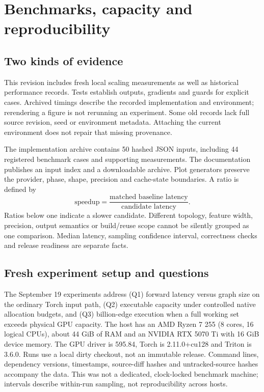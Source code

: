 \section{Benchmarks, capacity and reproducibility}
\label{sec:evaluation}
\subsection{Two kinds of evidence}
This revision includes fresh local scaling measurements as well as historical
performance records. Tests establish outputs, gradients and guards for explicit
cases. Archived timings describe the recorded implementation and environment;
rerendering a figure is not rerunning an experiment. Some old records lack full
source revision, seed or environment metadata. Attaching the current environment
does not repair that missing provenance.

The implementation archive contains 50 hashed JSON inputs, including 44 registered
benchmark cases and supporting measurements. The documentation publishes an input
index and a downloadable archive. Plot generators preserve the provider, phase,
shape, precision and cache-state boundaries. A ratio is defined by
$$
 \text{speedup}=\frac{\text{matched baseline latency}}{\text{candidate latency}}.
$$
Ratios below one indicate a slower candidate. Different topology, feature width,
precision, output semantics or build/reuse scope cannot be silently grouped as
one comparison. Median latency, sampling confidence interval, correctness checks
and release readiness are separate facts.

\subsection{Fresh experiment setup and questions}
The September 19 experiments address (Q1) forward latency versus graph size on
the ordinary Torch input path, (Q2) executable capacity under controlled native
allocation budgets, and (Q3) billion-edge execution when a full working set
exceeds physical GPU capacity. The host has an AMD Ryzen 7 255 (8 cores, 16 logical
CPUs), about 44 GiB of RAM and an NVIDIA RTX 5070 Ti with 16 GiB device memory.
The GPU driver is 595.84, Torch is 2.11.0+cu128 and Triton is 3.6.0. Runs use a
local dirty checkout, not an immutable release. Command lines, dependency
versions, timestamps, source-diff hashes and untracked-source hashes accompany
the data. This was not a dedicated, clock-locked benchmark machine; intervals
describe within-run sampling, not reproducibility across hosts.

